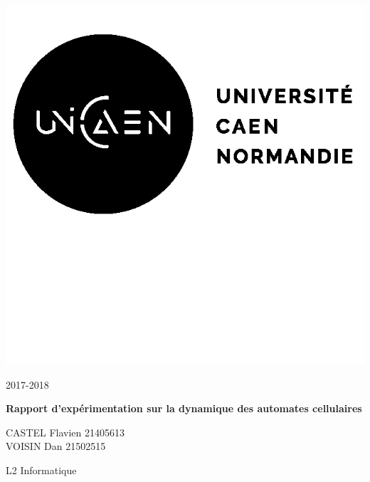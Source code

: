 \documentclass[12pt, a4paper]{article}
\begin{document}
    
    \begin{titlepage}
        \begin{minipage}{.4\linewidth}
            \includegraphics{img/logo.png}
        \end{minipage}
        \hfill
        \begin{minipage}{.4\linewidth}
            \begin{flushright}
                2017-2018
            \end{flushright}
        \end{minipage}
        
        \vspace{7cm}
        
        \begin{center}
            \textbf{\Huge{Rapport d'expérimentation sur la dynamique des automates cellulaires}}
        \end{center}
        
        \vspace{10cm}
        
        \begin{minipage}{.4\linewidth}
            CASTEL Flavien 21405613\\
            VOISIN Dan 21502515
        \end{minipage}
        \hfill
        \begin{minipage}{.4\linewidth}
            \begin{flushright}
                L2 Informatique
            \end{flushright}
        \end{minipage}
    
    \end{titlepage}
    
\end{document}
